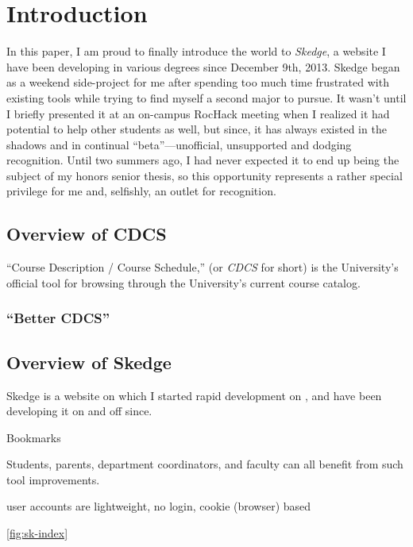 
\chapter{Introduction}

In this paper, I am proud to finally introduce the world to \emph{Skedge}, a website I have been developing in various degrees since December 9th, 2013. Skedge began as a weekend side-project for me after spending too much time frustrated with existing tools while trying to find myself a second major to pursue. It wasn't until I briefly presented it at an on-campus RocHack meeting when I realized it had potential to help other students as well, but since, it has always existed in the shadows and in continual ``beta''---unofficial, unsupported and dodging recognition. Until two summers ago, I had never expected it to end up being the subject of my honors senior thesis, so this opportunity represents a rather special privilege for me and, selfishly, an outlet for recognition.

\section{Overview of CDCS}

``Course Description / Course Schedule,'' (or \emph{CDCS} for short) is the University's official tool for browsing through the University's current course catalog. 

\label{fig:cdcs-index}

\subsection{``Better CDCS''}


\section{Overview of Skedge}

Skedge is a website on which I started rapid development on , and have been developing it on and off since.

Bookmarks

Students, parents, department coordinators, and faculty can all benefit from such tool improvements.

user accounts are lightweight, no login, cookie (browser) based

\ref{fig:sk-index}


